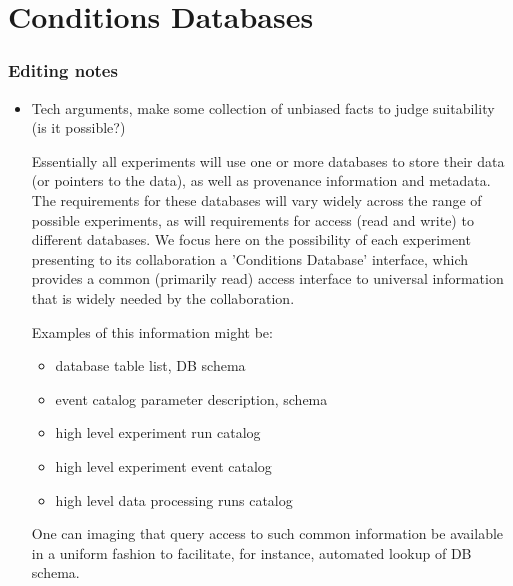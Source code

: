 \section{Conditions Databases}


\subsubsection{Editing notes}




\begin{itemize}
\item Tech arguments, make some collection of unbiased facts to judge suitability (is it possible?)

	Essentially all experiments will use one or more databases to
	store their data (or pointers to the data), as well as provenance 
	information and metadata.  The requirements for these databases will
	vary widely across the range of possible experiments, as will
	requirements for access (read and write) to different databases.  
	We focus here on the possibility of each experiment presenting
	to its collaboration a 'Conditions Database' interface, which
	provides a common (primarily read) access interface to universal
	information that is widely needed by the collaboration.

	Examples of this information might be:
	\begin{itemize}
	\item database table list, DB schema
	\item event catalog parameter description, schema
	\item high level experiment run catalog
	\item high level experiment event catalog
	\item high level data processing runs catalog
	\end{itemize}

	One can imaging that query access to such common information be
	available in a uniform fashion to facilitate, for instance,
	automated lookup of DB schema.  


\end{itemize}
